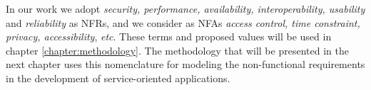 



In our work we adopt \textit{security, performance, availability,
interoperability, usability} and \textit{reliability} as NFRs, and we consider
as NFAs \textit{access control, time constraint, privacy, accessibility},
\textit{etc}. These terms and proposed values will be used in chapter
 \ref{chapter:methodology}. The methodology that will be presented in the next
 chapter uses this nomenclature for modeling the non-functional requirements in
 the development of service-oriented applications.


